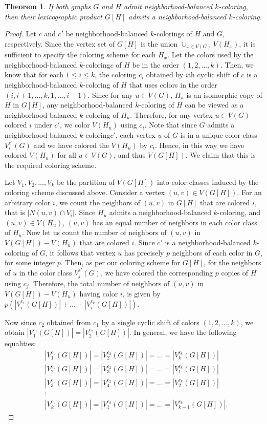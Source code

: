 \documentclass[12pt]{article}
\newtheorem{theorem}{Theorem}[section]
\newcommand{\nbc}{neighborhood-balanced $k$-coloring\xspace}
\newcommand{\nbcs}{neighborhood-balanced $k$-colorings\xspace}
\begin{document}
\begin{theorem}
    If both graphs $G$ and $H$ admit \nbc, then their lexicographic product $G[H]$ admits a \nbc. 
\end{theorem}
\begin{proof}
    Let $c$ and $c'$ be \nbcs of $H$ and $G$, respectively.
    Since the vertex set of $G[H]$ is the union $\cup_{x\in V(G)} V(H_x)$, it is sufficient to specify the coloring scheme for each $H_x$.
    Let the colors used by the \nbc $c$ of $H$ be in the order $(1, 2, \dots, k)$.
    Then, we know that for each $1 \le i \le k$, the coloring $c_i$ obtained by $i$th cyclic shift of $c$ is a \nbc of $H$ that uses colors in the order $(i, i+1, \dots, k, 1, \dots, i-1)$. 
    Since for any $u \in V(G)$, $H_u$ is an isomorphic copy of $H$ in $G[H]$, any \nbc of $H$ can be viewed as a \nbc of $H_u$.
    Therefore, for any vertex $u \in V(G)$ colored $i$ under $c'$, we color $V(H_u)$ using $c_i$.
    Note that since $G$ admits a \nbc $c'$, each vertex $u$ of $G$ is in a unique color class $V_i^{c'}(G)$ and we have colored the $V(H_u)$ by $c_i$.
    Hence, in this way we have colored $V(H_u)$ for all $u \in V(G)$, and thus $V(G[H])$.
    We claim that this is the required coloring scheme.
    
    Let $V_1, V_2, \dots, V_k$ be the partition of $V(G[H])$ into color classes induced by the coloring scheme discussed above.
    Consider a vertex $(u,v) \in V(G[H])$.
    For an arbitrary color $i$, we count the neighbors of $(u,v)$ in $G[H]$ that are colored $i$, that is $|N(u,v) \cap V_i|$.
    Since $H_u$ admits a \nbc, and $(u,v) \in V(H_u)$, $(u,v)$ has an equal number of neighbors in each color class of $H_u$.
    Now let us count the number of neighbors of $(u,v)$ in $V(G[H]) - V(H_u)$ that are colored $i$.
    Since $c'$ is a neighborhood-balanced $k$-coloring of $G$, it follows that vertex $u$ has precisely $p$ neighbors of each color in $G$, for some integer $p$.
    Then, as per our coloring scheme for $G[H]$, for the neighbors of $u$ in the color class $V_j^{c'}(G)$, we have colored the corresponding $p$ copies of $H$ using $c_j$.
    Therefore, the total number of neighbors of $(u,v)$ in $V(G[H]) - V(H_u)$ having color $i$, is given by $p (|V_i^{c_1}(G[H])| + \dots + |V_i^{c_k}(G[H])|)$.
        
    Now since $c_2$ obtained from $c_1$ by a single cyclic shift of colors $(1, 2, \dots, k)$, we obtain $|V_1^{c_1}(G[H])| = |V_2^{c_2}(G[H])|$.
    In general, we have the following equalities:
        \begin{align*}
            &|V_1^{c_1}(G[H])| = |V_2^{c_2}(G[H])| = \dots = |V_k^{c_k}(G[H])|\\
            &|V_2^{c_1}(G[H])| = |V_3^{c_2}(G[H])| = \dots = |V_1^{c_k}(G[H])|\\
            &|V_3^{c_1}(G[H])| = |V_4^{c_2}(G[H])| = \dots = |V_2^{c_k}(G[H])|\\
            &\vdots\\
            &|V_k^{c_1}(G[H])| = |V_1^{c_2}(G[H])| = \dots = |V_{k-1}^{c_k}(G[H])|.
        \end{align*}


\end{proof}
\end{document}
